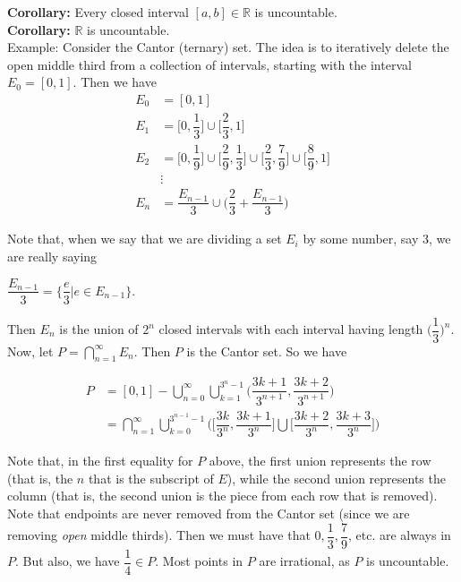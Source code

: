 \documentclass{article}
\begin{document}
\textbf{Corollary:} Every closed interval $[a,b] \in \mathbb{R}$ is uncountable.\\

\textbf{Corollary:} $\mathbb{R}$ is uncountable.\\

\textcolor{NavyBlue}{Example:} Consider the Cantor (ternary) set. The idea is to iteratively delete the open middle third from a collection of intervals, starting with the interval $E_0=[0,1]$. Then we have
\begin{align*}
    E_0&=[0,1]\\
    E_1 &= \biggl[0, \dfrac{1}{3}\biggr] \cup \biggl[\dfrac{2}{3},1\biggr]\\
    E_2 &= \biggl[0, \dfrac{1}{9} \biggr] \cup \biggl[\dfrac{2}{9}, \dfrac{1}{3} \biggr] \cup \biggl[\dfrac{2}{3}, \dfrac{7}{9} \biggr] \cup \biggl[\dfrac{8}{9}, 1 \biggr] \\
    &\vdots \\
    E_n &= \dfrac{E_{n-1}}{3} \cup \biggl( \dfrac{2}{3}+\dfrac{E_{n-1}}{3} \biggr)
\end{align*}

Note that, when we say that we are dividing a set $E_i$ by some number, say $3$, we are really saying
\begin{center}
    $\dfrac{E_{n-1}}{3} = \biggl\{ \dfrac{e}{3} \bigg| e \in E_{n-1} \biggr\}$.
\end{center}

Then $E_n$ is the union of $2^n$ closed intervals with each interval having length $\biggl( \dfrac{1}{3} \biggr)^n$. Now, let $P = \bigcap_{n=1}^{\infty} E_n$. Then $P$ is the Cantor set. So we have

\begin{align*}
    P &= [0,1]- \bigcup_{n = 0}^{\infty} \bigcup_{k=1}^{3^n-1} \biggl( \dfrac{3k+1}{3^{n+1}}, \dfrac{3k+2}{3^{n+1}} \biggr) \\
    &= \bigcap_{n=1}^{\infty} \bigcup_{k=0}^{3^{n-1}-1} \biggl(\biggl[ \dfrac{3k}{3^n}, \dfrac{3k+1}{3^n} \biggr] \bigcup \biggl[ \dfrac{3k+2}{3^n}, \dfrac{3k+3}{3^n} \biggr]  \biggr)
\end{align*}

Note that, in the first equality for $P$ above, the first union represents the row (that is, the $n$ that is the subscript of $E$), while the second union represents the column (that is, the second union is the piece from each row that is removed). \\

Note that endpoints are never removed from the Cantor set (since we are removing \textit{open} middle thirds). Then we must have that $0, \dfrac{1}{3}, \dfrac{7}{9}$, etc. are always in $P$. But also, we have $\dfrac{1}{4} \in P$. Most points in $P$ are irrational, as $P$ is uncountable.\\
\end{document}
